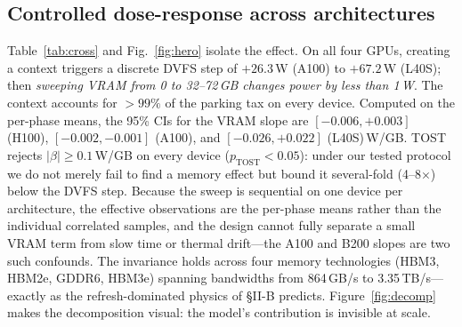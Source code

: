 \documentclass[conference]{IEEEtran}
\begin{document}
\subsection{Controlled dose-response across architectures}
Table~\ref{tab:cross} and Fig.~\ref{fig:hero} isolate the effect. On all four GPUs, creating a context triggers a discrete DVFS step of $+26.3$\,W (A100) to $+67.2$\,W (L40S); then \emph{sweeping VRAM from 0 to 32--72\,GB changes power by less than 1\,W}. The context accounts for $>99\%$ of the parking tax on every device. Computed on the per-phase means, the 95\% CIs for the VRAM slope are $[-0.006,+0.003]$ (H100), $[-0.002,-0.001]$ (A100), and $[-0.026,+0.022]$ (L40S)\,W/GB. TOST rejects $|\beta| \ge 0.1$\,W/GB on every device ($p_{\text{TOST}} < 0.05$): under our tested protocol we do not merely fail to find a memory effect but bound it several-fold (4--8$\times$) below the DVFS step. Because the sweep is sequential on one device per architecture, the effective observations are the per-phase means rather than the individual correlated samples, and the design cannot fully separate a small VRAM term from slow time or thermal drift---the A100 and B200 slopes are two such confounds. The invariance holds across four memory technologies (HBM3, HBM2e, GDDR6, HBM3e) spanning bandwidths from 864\,GB/s to 3.35\,TB/s---exactly as the refresh-dominated physics of \S{II-B} predicts. Figure~\ref{fig:decomp} makes the decomposition visual: the model's contribution is invisible at scale.
\end{document}
